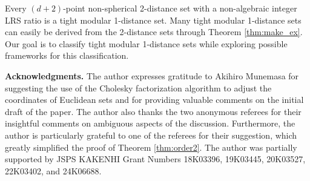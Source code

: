 \documentclass[a4paper, 11pt]{article}
\theoremstyle{definition}
\begin{document}
Every $(d+2)$-point non-spherical 2-distance set with a non-algebraic integer LRS ratio is a tight modular 1-distance set.  
Many tight modular 1-distance sets can easily be derived from the 2-distance sets through Theorem \ref{thm:make_ex}.  
Our goal is to classify tight modular 1-distance sets while exploring possible frameworks for this classification. 



\bigskip

\noindent
\textbf{Acknowledgments.} 
The author expresses gratitude to Akihiro Munemasa for suggesting the use of the Cholesky factorization algorithm to adjust the coordinates of Euclidean sets and for providing valuable comments on the initial draft of the paper. 
The author also thanks the two anonymous referees for their insightful comments on ambiguous aspects of the discussion. 
Furthermore, the author is particularly grateful to one of the referees for their suggestion, which greatly simplified the proof of Theorem \ref{thm:order2}. 
 The author was partially supported by JSPS KAKENHI Grant Numbers 18K03396, 19K03445, 20K03527, 22K03402, and 24K06688. 
\end{document}
